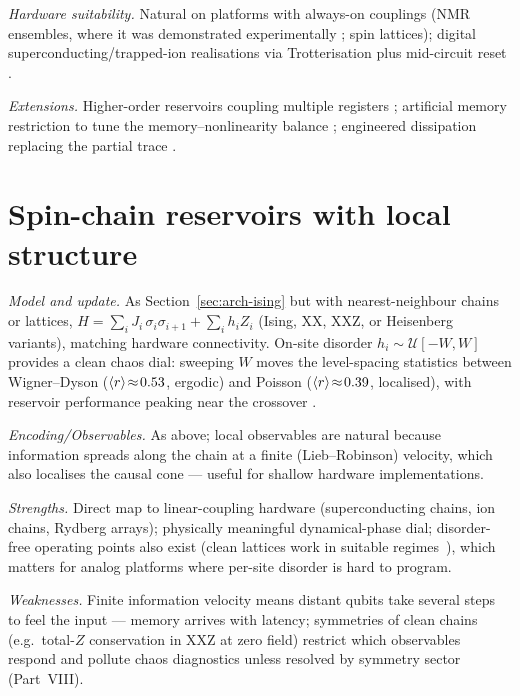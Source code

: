\emph{Hardware suitability.} Natural on platforms with always-on couplings
(NMR ensembles, where it was demonstrated experimentally
\citep{negoro2018machine}; spin lattices); digital superconducting/trapped-ion
realisations via Trotterisation plus mid-circuit reset
\citep{chen2020temporal,hu2024overcoming,yasuda2023quantum}.

\emph{Extensions.} Higher-order reservoirs coupling multiple registers
\citep{tran2020higher}; artificial memory restriction to tune the
memory--nonlinearity balance \citep{cindrak2024enhancing}; engineered
dissipation replacing the partial trace \citep{sannia2024dissipation}.

\section{Spin-chain reservoirs with local structure}
\label{sec:arch-chain}

\emph{Model and update.} As Section~\ref{sec:arch-ising} but with
nearest-neighbour chains or lattices,
$H=\sum_i J_i\,\sigma_i\sigma_{i+1} + \sum_i h_i Z_i$ (Ising, XX, XXZ, or
Heisenberg variants), matching hardware connectivity. On-site disorder
$h_i \sim \mathcal{U}[-W,W]$ provides a clean chaos dial: sweeping $W$ moves
the level-spacing statistics between Wigner--Dyson ($\langle r\rangle\!\approx\!0.53$,
ergodic) and Poisson ($\langle r\rangle\!\approx\!0.39$, localised), with reservoir
performance peaking near the crossover
\citep{martinez2021dynamical,kobayashi2026edge}.

\emph{Encoding/Observables.} As above; local observables are natural because
information spreads along the chain at a finite (Lieb--Robinson) velocity,
which also localises the causal cone --- useful for shallow hardware
implementations.

\emph{Strengths.} Direct map to linear-coupling hardware (superconducting
chains, ion chains, Rydberg arrays); physically meaningful dynamical-phase
dial; disorder-free operating points also exist (clean lattices work in
suitable regimes~\citep{llodra2025atomic}), which matters for analog platforms
where per-site disorder is hard to program.

\emph{Weaknesses.} Finite information velocity means distant qubits take
several steps to feel the input --- memory arrives with latency; symmetries of
clean chains (e.g.\ total-$Z$ conservation in XXZ at zero field) restrict
which observables respond and pollute chaos diagnostics unless resolved by
symmetry sector (Part~VIII).

